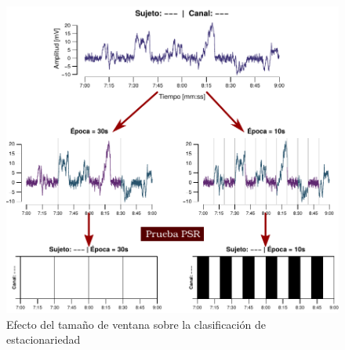 \begin{figure}
\centering
\includegraphics[width=\linewidth]{./img_diagramas/epocas_diferentes_v2.pdf}
\caption{Efecto del tamaño de ventana sobre la clasificación de estacionariedad}
\label{epocas_diferentes}
\end{figure}

